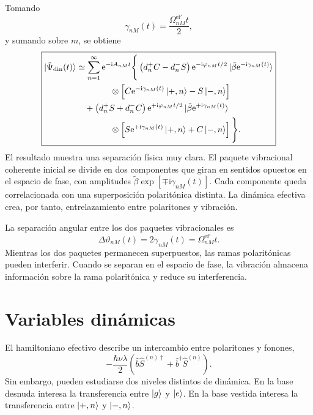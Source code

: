\documentclass[11pt]{article}
\newcommand{\ii}{\mathrm{i}}
\newcommand{\ee}{\mathrm{e}}
\newcommand{\bdag}{\hat b^\dagger}
\begin{document}
Tomando
\begin{equation}
  \gamma_{nM}(t)
  =
  \frac{\Omega_{nM}^{\mathrm{ef}\prime}t}{2},
\end{equation}
y sumando sobre $m$, se obtiene
\begin{equation}
  \boxed{
  \begin{aligned}
  \ket{\tilde\Psi_{\mathrm{din}}(t)}
  &\simeq
  \sum_{n=1}^{\infty}
  \ee^{-\ii A_{nM}t}
  \Bigg\{
  \left(d_n^+C-d_n^-S\right)
  \ee^{-\ii\varphi_{nM}t/2}
  \ket{\tilde\beta\ee^{-\ii\gamma_{nM}(t)}}
  \\
  &\qquad\qquad\otimes
  \left[
  C\ee^{-\ii\gamma_{nM}(t)}\ket{+,n}
  -
  S\ket{-,n}
  \right]
  \\
  &\quad+
  \left(d_n^+S+d_n^-C\right)
  \ee^{+\ii\varphi_{nM}t/2}
  \ket{\tilde\beta\ee^{+\ii\gamma_{nM}(t)}}
  \\
  &\qquad\qquad\otimes
  \left[
  S\ee^{+\ii\gamma_{nM}(t)}\ket{+,n}
  +
  C\ket{-,n}
  \right]
  \Bigg\}.
  \end{aligned}
  }
\end{equation}
El resultado muestra una separaci\'on f\'isica muy clara. El paquete
vibracional coherente inicial se divide en dos componentes que giran en
sentidos opuestos en el espacio de fase, con amplitudes
$\tilde\beta\exp[\mp\ii\gamma_{nM}(t)]$. Cada componente queda correlacionada
con una superposici\'on polarit\'onica distinta. La din\'amica efectiva crea,
por tanto, entrelazamiento entre polaritones y vibraci\'on.

La separaci\'on angular entre los dos paquetes vibracionales es
\begin{equation}
  \boxed{
  \Delta\vartheta_{nM}(t)
  =
  2\gamma_{nM}(t)
  =
  \Omega_{nM}^{\mathrm{ef}\prime}t.
  }
\end{equation}
Mientras los dos paquetes permanecen superpuestos, las ramas polarit\'onicas
pueden interferir. Cuando se separan en el espacio de fase, la vibraci\'on
almacena informaci\'on sobre la rama polarit\'onica y reduce su interferencia.

\section{Variables din\'amicas}

El hamiltoniano efectivo describe un intercambio entre polaritones y fonones,
\begin{equation}
  -\frac{\hbar\nu\lambda}{2}
  \left(
  \hat b\hat S^{(n)\dagger}
  +
  \bdag\hat S^{(n)}
  \right).
\end{equation}
Sin embargo, pueden estudiarse dos niveles distintos de din\'amica. En la base
desnuda interesa la transferencia entre $\ket g$ y $\ket e$. En la base
vestida interesa la transferencia entre $\ket{+,n}$ y $\ket{-,n}$.
\end{document}
